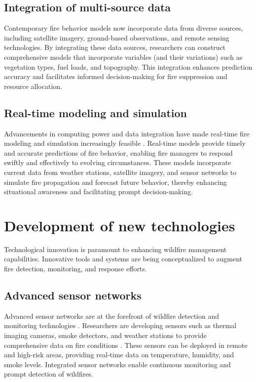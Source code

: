 \documentclass[
  12 pt,
]{Nemilov}
\begin{document}
\subsection{Integration of multi-source data}\label{integration-of-multi-source-data}

Contemporary fire behavior models now incorporate data from diverse sources, including satellite imagery, ground-based observations, and remote sensing technologies. By integrating these data sources, researchers can construct comprehensive models that incorporate variables (and their variations) such as vegetation types, fuel loads, and topography. This integration enhances prediction accuracy and facilitates informed decision-making for fire suppression and resource allocation.

\subsection{Real-time modeling and simulation}\label{real-time-modeling-and-simulation}

Advancements in computing power and data integration have made real-time fire modeling and simulation increasingly feasible \citep{cardil2019adjusting, wu2016real}. Real-time models provide timely and accurate predictions of fire behavior, enabling fire managers to respond swiftly and effectively to evolving circumstances. These models incorporate current data from weather stations, satellite imagery, and sensor networks to simulate fire propagation and forecast future behavior, thereby enhancing situational awareness and facilitating prompt decision-making.

\section{Development of new technologies}\label{development-of-new-technologies}

Technological innovation is paramount to enhancing wildfire management capabilities. Innovative tools and systems are being conceptualized to augment fire detection, monitoring, and response efforts.

\subsection{Advanced sensor networks}\label{advanced-sensor-networks}

Advanced sensor networks are at the forefront of wildfire detection and monitoring technologies \citep{dogra2021review}. Researchers are developing sensors such as thermal imaging cameras, smoke detectors, and weather stations to provide comprehensive data on fire conditions \citep{allison2016airborne, rahman2021computer, vejmelka2016data}. These sensors can be deployed in remote and high-risk areas, providing real-time data on temperature, humidity, and smoke levels. Integrated sensor networks enable continuous monitoring and prompt detection of wildfires.
\end{document}
